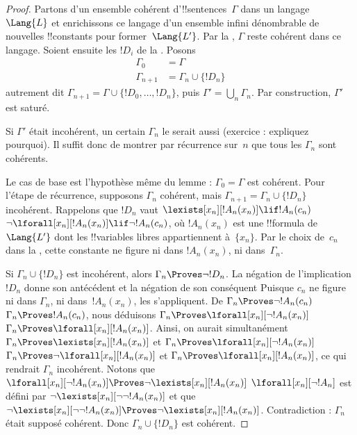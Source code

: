 \documentclass[../../../include/open-logic-section]{subfiles}
\begin{document}
\begin{proof}
Partons d'un ensemble cohérent d'!!{sentence}s~$\Gamma$ dans un
langage~$\Lang{L}$ et enrichissons ce langage d'un ensemble infini
dénombrable de nouvelles !!{constant}s pour former~$\Lang{L'}$.
Par la , $\Gamma$ reste cohérent dans ce langage.
Soient ensuite les $!D_i$ de la . Posons
\begin{align*}
\Gamma_0 & = \Gamma \\
\Gamma_{n+1} & = \Gamma_n \cup \{!D_n \}
\end{align*}
autrement dit $\Gamma_{n+1}=\Gamma\cup\{!D_0,\dots,!D_n\}$,
puis $\Gamma'=\bigcup_n\Gamma_n$. Par construction, $\Gamma'$
est saturé.

Si $\Gamma'$ était incohérent, un certain $\Gamma_n$ le serait aussi
(exercice : expliquez pourquoi). Il suffit donc de montrer par
récurrence sur~$n$ que tous les $\Gamma_n$ sont cohérents.

Le cas de base est l'hypothèse même du lemme :
$\Gamma_0=\Gamma$ est cohérent. Pour l'étape de récurrence,
supposons $\Gamma_n$ cohérent, mais
$\Gamma_{n+1}=\Gamma_n\cup\{!D_n\}$ incohérent. Rappelons que
$!D_n$ vaut
{$\lexists[x_{n}][!A_{n}(x_n)] \lif !A_{n}(c_{n})$}
{$\lnot\lforall[x_{n}][!A_{n}(x_n)] \lif \lnot !A_{n}(c_{n})$},
où $!A_n(x_n)$ est une !!{formula} de~$\Lang{L'}$ dont les
!!{variable}s libres appartiennent à~$\{x_n\}$. Par le choix
de~$c_n$ dans la
, cette constante ne figure ni dans
$!A_n(x_n)$, ni dans~$\Gamma_n$.

Si $\Gamma_n\cup\{!D_n\}$ est incohérent, alors
$\Gamma_n\Proves\lnot !D_n$. La négation de l'implication $!D_n$
donne son antécédent et la négation de son conséquent%
Puisque $c_n$ ne figure ni dans $\Gamma_n$, ni dans~$!A_n(x_n)$,
les 
s'appliquent. De
{$\Gamma_n \Proves \lnot !A_n(c_n)$}
{$\Gamma_n \Proves !A_n(c_n)$},
nous déduisons
{$\Gamma_n \Proves \lforall[x_n][\lnot !A_n(x_n)]$}
{$\Gamma_n \Proves \lforall[x_n][!A_n(x_n)]$}.
Ainsi, on aurait simultanément
{$\Gamma_n \Proves \lexists[x_n][!A_n(x_n)]$ et
$\Gamma_n \Proves \lforall[x_n][\lnot !A_n(x_n)]$}
{$\Gamma_n \Proves \lnot\lforall[x_n][!A_n(x_n)]$ et
$\Gamma_n \Proves \lforall[x_n][!A_n(x_n)]$},
ce qui rendrait $\Gamma_n$ incohérent.
{Notons que
{$\lforall[x_n][\lnot !A_n(x_n)] \Proves
  \lnot\lexists[x_n][!A_n(x_n)]$}
{$\lforall[x_n][\lnot !A_n]$ est défini par
  $\lnot\lexists[x_n][\lnot\lnot !A_n(x_n)]$ et que
  $\lnot\lexists[x_n][\lnot\lnot !A_n(x_n)] \Proves
  \lnot\lexists[x_n][!A_n(x_n)]$}.}{}
Contradiction : $\Gamma_n$ était supposé cohérent. Donc
$\Gamma_n\cup\{!D_n\}$ est cohérent.
\end{proof}
\end{document}
